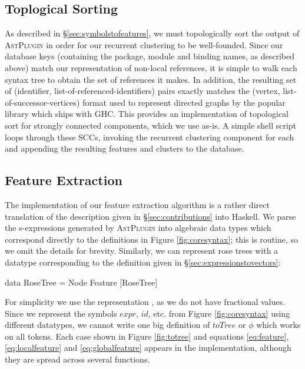 \subsection{Toplogical Sorting}

As described in \S \ref{sec:symbolstofeatures}, we must topologically sort the output of \textsc{AstPlugin} in order for our recurrent clustering to be well-founded. Since our database keys (containing the package, module and binding names, as described above) match our representation of non-local references, it is simple to walk each syntax tree to obtain the set of references it makes. In addition, the resulting set of (identifier, list-of-referenced-identifiers) pairs exactly matches the (vertex, list-of-successor-vertices) format used to represent directed graphs by the popular  library which ships with GHC. This provides an implementation of topological sort for strongly connected components, which we use as-is. A simple shell script loops through these SCCs, invoking the recurrent clustering component for each and appending the resulting features and clusters to the database.

\subsection{Feature Extraction}

The implementation of our feature extraction algorithm is a rather direct translation of the description given in \S \ref{sec:contributions} into Haskell. We parse the s-expressions generated by \textsc{AstPlugin} into algebraic data types which correspond directly to the definitions in Figure \ref{fig:coresyntax}; this is routine, so we omit the details for brevity. Similarly, we can represent rose trees with a datatype corresponding to the definition given in \S \ref{sec:expressionstovectors}:

\begin{haskell}
data RoseTree = Node Feature [RoseTree]
\end{haskell}

For simplicity we use the representation , as we do not have fractional values. Since we represent the symbols $expr$, $id$, etc. from Figure \ref{fig:coresyntax} using different datatypes, we cannot write one big definition of $toTree$ or $\phi$ which works on all tokens. Each case shown in Figure \ref{fig:totree} and equations \ref{eq:feature}, \ref{eq:localfeature} and \ref{eq:globalfeature} appears in the implementation, although they are spread across several functions.


